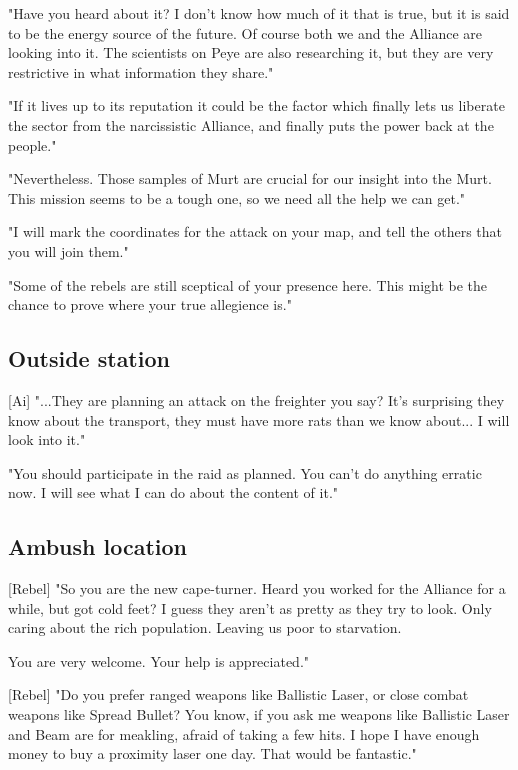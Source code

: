 \documentclass[a4paper,12pt]{article}
\begin{document}
"Have you heard about it? I don't know how much of it that is true, but it
is said to be the energy source of the future. Of course both we and the
Alliance are looking into it. The scientists on Peye are also researching it,
but they are very restrictive in what information they share."

"If it lives up to its reputation it could be the factor which finally lets
us liberate the sector from the narcissistic Alliance, and finally puts
the power back at the people."

"Nevertheless. Those samples of Murt are crucial for our insight into the Murt.
This mission seems to be a tough one, so we need all the help we can get."

"I will mark the coordinates for the attack on your map, and tell the others
that you will join them."

"Some of the rebels are still sceptical of your presence here. This might be
the chance to prove where your true allegience is."

\subsection{Outside station}

[Ai] "...They are planning an attack on the freighter you say? It's surprising
they know about the transport, they must have more rats than we know about...
I will look into it."

"You should participate in the raid as planned. You can't
do anything erratic now. I will see what I can do about the content of it."

\subsection{Ambush location}

[Rebel] "So you are the new cape-turner. Heard you worked for the Alliance
for a while, but got cold feet? I guess they aren't as pretty as they try
to look. Only caring about the rich population. Leaving us poor to starvation.

You are very welcome. Your help is appreciated."

[Rebel] "Do you prefer ranged weapons like Ballistic Laser, or close combat
weapons like Spread Bullet? You know, if you ask me weapons like Ballistic Laser and Beam
are for meakling, afraid of taking a few hits.
I hope I have enough money to buy a proximity laser one day. That would be fantastic."
\end{document}
